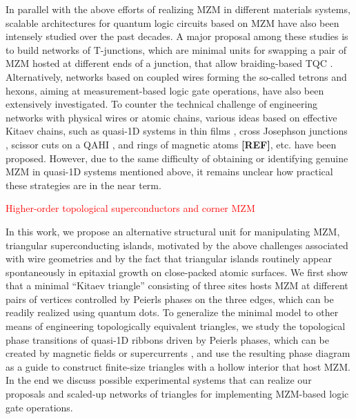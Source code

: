 \documentclass[aps,prb,showpacs,amsmath,twocolumn,amssymb,superscriptaddress]{revtex4-2}
\newcommand{\Red}[1]{\textcolor{red}{#1}}
\begin{document}
In parallel with the above efforts of realizing MZM in different materials systems, scalable architectures for quantum logic circuits based on MZM have also been intensely studied over the past decades. A major proposal among these studies is to build networks of T-junctions, which are minimal units for swapping a pair of MZM hosted at different ends of a junction, that allow braiding-based TQC \cite{karzigScalableDesignsQuasiparticlepoisoningprotected2017}. Alternatively, networks based on coupled wires forming the so-called tetrons and hexons, aiming at measurement-based logic gate operations, have also been extensively investigated. To counter the technical challenge of engineering networks with physical wires or atomic chains, various ideas based on effective Kitaev chains, such as quasi-1D systems in thin films \cite{potterMultichannelGeneralizationKitaev2010}, cross Josephson junctions \cite{zhouPhaseControlMajorana2020}, scissor cuts on a QAHI \cite{xieCreatingLocalizedMajorana2021}, and rings of magnetic atoms {\bf [REF]}, etc. have been proposed. However, due to the same difficulty of obtaining or identifying genuine MZM in quasi-1D systems mentioned above, it remains unclear how practical these strategies are in the near term.

\Red{Higher-order topological superconductors and corner MZM}

In this work, we propose an alternative structural unit for manipulating MZM, triangular superconducting islands, motivated by the above challenges associated with wire geometries and by the fact that triangular islands routinely appear spontaneously in epitaxial growth \cite{pietzschSpinResolvedElectronicStructure2006} on close-packed atomic surfaces. We first show that a minimal ``Kitaev triangle'' consisting of three sites hosts MZM at different pairs of vertices controlled by Peierls phases on the three edges, which can be readily realized using quantum dots. To generalize the minimal model to other means of engineering topologically equivalent triangles, we study the topological phase transitions of quasi-1D ribbons driven by Peierls phases, which can be created by magnetic fields or supercurrents \cite{romitoManipulatingMajoranaFermions2012, takasanSupercurrentinducedTopologicalPhase2022}, and use the resulting phase diagram as a guide to construct finite-size triangles with a hollow interior that host MZM. In the end we discuss possible experimental systems that can realize our proposals and scaled-up networks of triangles for implementing MZM-based logic gate operations. 
\end{document}
